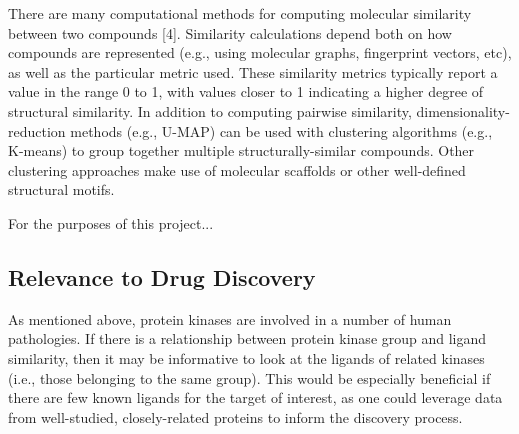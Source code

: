\documentclass[11pt]{article}
\begin{document}
There are many computational methods for computing molecular similarity between two compounds [4]. Similarity calculations depend both on how compounds are represented (e.g., using molecular graphs, fingerprint vectors, etc), as well as the particular metric used. These similarity metrics typically report a value in the range 0 to 1, with values closer to 1 indicating a higher degree of structural similarity. In addition to computing pairwise similarity, dimensionality-reduction methods (e.g., U-MAP) can be used with clustering algorithms (e.g., K-means) to group together multiple structurally-similar compounds. Other clustering approaches make use of molecular scaffolds or other well-defined structural motifs.

For the purposes of this project... %

\subsection*{Relevance to Drug Discovery}

As mentioned above, protein kinases are involved in a number of human pathologies. 
If there is a relationship between protein kinase group and ligand similarity, then it may be informative to look at the ligands of related kinases (i.e., those belonging to the same group). 
This would be especially beneficial if there are few known ligands for the target of interest, as one could leverage data from well-studied, closely-related proteins to inform the discovery process. 
\end{document}

